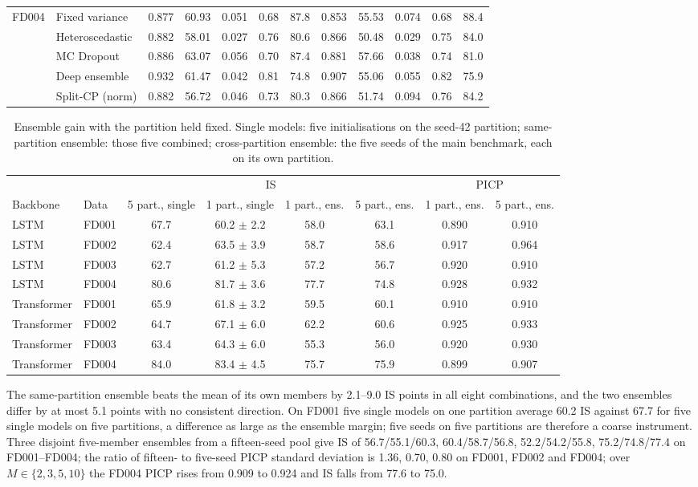 \documentclass[10pt,a4paper]{article}
\newcommand{\NSameGain}{2.1--9.0}
\newcommand{\NSameCrossMax}{5.1}
\newcommand{\NOnePartSingleFDone}{60.2}
\newcommand{\NFivePartSingleFDone}{67.7}
\newcommand{\NMSweepPICP}{0.909 to 0.924}
\newcommand{\NMSweepIS}{77.6 to 75.0}
\newcommand{\NIndepIS}{56.7/55.1/60.3, 60.4/58.7/56.8, 52.2/54.2/55.8, 75.2/74.8/77.4}
\newcommand{\NNFiveFifteen}{1.36, 0.70, 0.80}
\begin{document}
\begin{table}[H]
\begin{tabular}{llccccc|ccccc}
\midrule
\multirow{5}{*}{FD004} & Fixed variance & 0.877 & 60.93 & 0.051 & 0.68 & 87.8 & 0.853 & 55.53 & 0.074 & 0.68 & 88.4 \\
 & Heteroscedastic & 0.882 & 58.01 & 0.027 & 0.76 & 80.6 & 0.866 & 50.48 & 0.029 & 0.75 & 84.0 \\
 & MC Dropout & 0.886 & 63.07 & 0.056 & 0.70 & 87.4 & 0.881 & 57.66 & 0.038 & 0.74 & 81.0 \\
 & Deep ensemble & 0.932 & 61.47 & 0.042 & 0.81 & 74.8 & 0.907 & 55.06 & 0.055 & 0.82 & 75.9 \\
 & Split-CP (norm) & 0.882 & 56.72 & 0.046 & 0.73 & 80.3 & 0.866 & 51.74 & 0.094 & 0.76 & 84.2 \\
\bottomrule\end{tabular}
\end{table}
\begin{table}[H]\centering\scriptsize
\caption{Ensemble gain with the partition held fixed. Single models: five initialisations on the seed-42 partition; same-partition ensemble: those five combined; cross-partition ensemble: the five seeds of the main benchmark, each on its own partition.}
\begin{tabular}{llcccccc}\toprule
 & & \multicolumn{4}{c}{IS} & \multicolumn{2}{c}{PICP} \\
Backbone & Data & 5 part., single & 1 part., single & 1 part., ens. & 5 part., ens. & 1 part., ens. & 5 part., ens. \\ \midrule
LSTM & FD001 & 67.7 & 60.2 $\pm$ 2.2 & 58.0 & 63.1 & 0.890 & 0.910 \\
LSTM & FD002 & 62.4 & 63.5 $\pm$ 3.9 & 58.7 & 58.6 & 0.917 & 0.964 \\
LSTM & FD003 & 62.7 & 61.2 $\pm$ 5.3 & 57.2 & 56.7 & 0.920 & 0.910 \\
LSTM & FD004 & 80.6 & 81.7 $\pm$ 3.6 & 77.7 & 74.8 & 0.928 & 0.932 \\
Transformer & FD001 & 65.9 & 61.8 $\pm$ 3.2 & 59.5 & 60.1 & 0.910 & 0.910 \\
Transformer & FD002 & 64.7 & 67.1 $\pm$ 6.0 & 62.2 & 60.6 & 0.925 & 0.933 \\
Transformer & FD003 & 63.4 & 64.3 $\pm$ 6.0 & 55.3 & 56.0 & 0.920 & 0.930 \\
Transformer & FD004 & 84.0 & 83.4 $\pm$ 4.5 & 75.7 & 75.9 & 0.899 & 0.907 \\
\bottomrule\end{tabular}
\end{table}
The same-partition ensemble beats the mean of its own members by \NSameGain{} IS points in all eight combinations, and the two ensembles differ by at most \NSameCrossMax{} points with no consistent direction. On FD001 five single models on one partition average \NOnePartSingleFDone{} IS against \NFivePartSingleFDone{} for five single models on five partitions, a difference as large as the ensemble margin; five seeds on five partitions are therefore a coarse instrument. Three disjoint five-member ensembles from a fifteen-seed pool give IS of \NIndepIS{} on FD001--FD004; the ratio of fifteen- to five-seed PICP standard deviation is \NNFiveFifteen{} on FD001, FD002 and FD004; over $M\in\{2,3,5,10\}$ the FD004 PICP rises from \NMSweepPICP{} and IS falls from \NMSweepIS.
\end{document}
